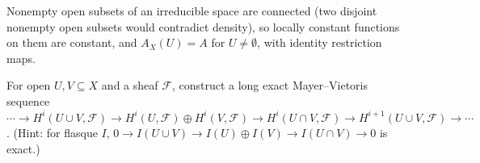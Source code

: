 \begin{solution}
Nonempty open subsets of an irreducible space are connected (two disjoint nonempty open subsets would contradict density), so locally constant functions on them are constant, and
$A_X(U) = A$ for $U \neq \emptyset$, with identity restriction maps.
\end{solution}

\begin{exercise}\label{sheaves:exercise-mayer-vietoris-sheaves}
For open $U, V \subseteq X$ and a sheaf $\mathcal{F}$, construct a long exact Mayer--Vietoris sequence
$\cdots \to H^i(U \cup V, \mathcal{F}) \to H^i(U, \mathcal{F}) \oplus H^i(V, \mathcal{F}) \to H^i(U \cap V, \mathcal{F}) \to H^{i+1}(U \cup V, \mathcal{F}) \to \cdots$.
(Hint: for flasque $I$, $0 \to I(U \cup V) \to I(U) \oplus I(V) \to I(U \cap V) \to 0$ is exact.)
\end{exercise}
